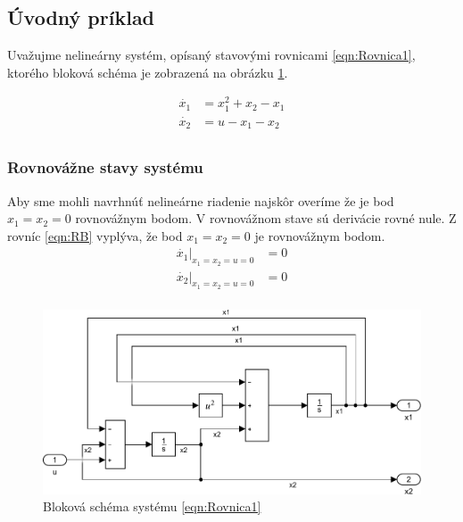 \documentclass[../main.tex]{subfiles}
\begin{document}
	
\subsection{Úvodný príklad}
Uvažujme nelineárny systém, opísaný stavovými rovnicami \ref{eqn:Rovnica1}, ktorého bloková schéma je zobrazená na obrázku \ref{fig:BlokovaSchemaPr1}. 

\begin{equation}
	\begin{aligned}
	\dot{x_1} &= x_1^2 + x_2 - x_1 \\
	\dot{x_2} &= u - x_1 - x_2 \\
	\end{aligned}
	\label{eqn:Rovnica1}
\end{equation}

\subsubsection{Rovnovážne stavy systému}
Aby sme mohli navrhnúť nelineárne riadenie najskôr overíme že je bod  $x_1 = x_2 = 0$ rovnovážnym bodom. V rovnovážnom stave sú derivácie rovné nule. Z rovníc \ref{eqn:RB} vyplýva, že bod $x_1 = x_2 = 0$ je rovnovážnym bodom.
\begin{equation}
\begin{aligned}
    \dot{x_1}|_{x_1 = x_2 = u = 0} &=  0 \\
\dot{x_2}|_{x_1 = x_2 = u = 0} &= 0 \\
\end{aligned}
\label{eqn:RB}
\end{equation}
\begin{figure}[H]
	\begin{center}\includegraphics[scale=0.8]{Rovnica1.pdf}\end{center}
	\caption{Bloková schéma systému \ref{eqn:Rovnica1}}
	\label{fig:BlokovaSchemaPr1}
\end{figure}
\end{document}

